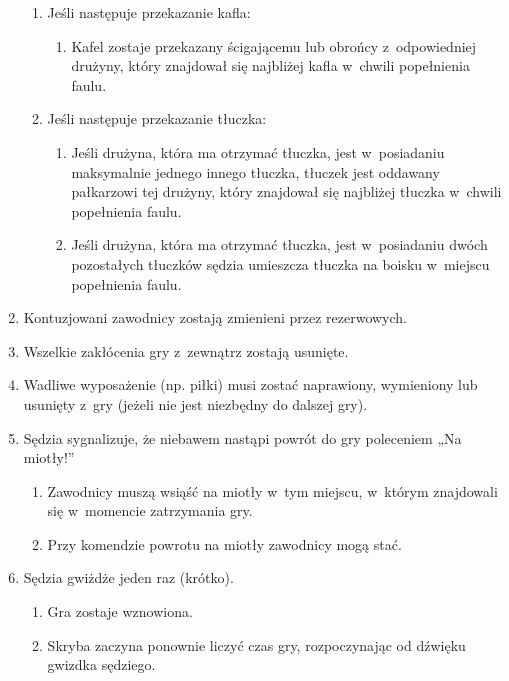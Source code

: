 \documentclass[12pt]{article}
\begin{document}
\begin{enumerate}
	      \begin{enumerate}
		      \item
		            Jeśli następuje przekazanie kafla:

		            \begin{enumerate}
			            \item
			                  Kafel zostaje przekazany ścigającemu lub obrońcy z~odpowiedniej
			                  drużyny, który znajdował się najbliżej kafla w~chwili popełnienia
			                  faulu.
		            \end{enumerate}
		      \item
		            Jeśli następuje przekazanie tłuczka:

		            \begin{enumerate}
			            \item
			                  Jeśli drużyna, która ma otrzymać tłuczka, jest w~posiadaniu
			                  maksymalnie jednego innego tłuczka, tłuczek jest oddawany
			                  pałkarzowi tej drużyny, który znajdował się najbliżej tłuczka w~chwili popełnienia faulu.
			            \item
			                  Jeśli drużyna, która ma otrzymać tłuczka, jest w~posiadaniu dwóch
			                  pozostałych tłuczków sędzia umieszcza tłuczka na boisku w~miejscu
			                  popełnienia faulu.
		            \end{enumerate}
	      \end{enumerate}
	\item
	      Kontuzjowani zawodnicy zostają zmienieni przez rezerwowych.
	\item
	      Wszelkie zakłócenia gry z~zewnątrz zostają usunięte.
	\item
	      Wadliwe wyposażenie (np. piłki) musi zostać naprawiony, wymieniony lub
	      usunięty z~gry (jeżeli nie jest niezbędny do dalszej gry).
	\item
	      Sędzia sygnalizuje, że niebawem nastąpi powrót do gry poleceniem „Na
	      miotły!''

	      \begin{enumerate}
		      \item
		            Zawodnicy muszą wsiąść na miotły w~tym miejscu, w~którym znajdowali
		            się w~momencie zatrzymania gry.
		      \item
		            Przy komendzie powrotu na miotły zawodnicy mogą stać.
	      \end{enumerate}
	\item
	      Sędzia gwiżdże jeden raz (krótko).

	      \begin{enumerate}
		      \item
		            Gra zostaje wznowiona.
		      \item
		            Skryba zaczyna ponownie liczyć czas gry, rozpoczynając od dźwięku
		            gwizdka sędziego.
	      \end{enumerate}
\end{enumerate}
\end{document}
